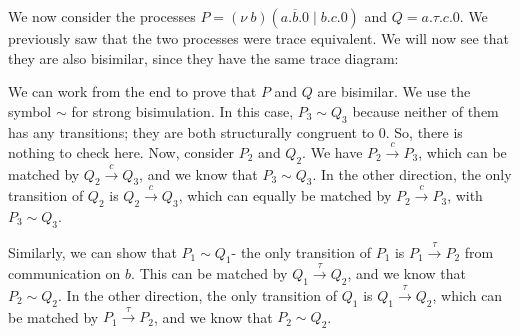 \documentclass[a4paper, openany]{memoir}
\theoremstyle{definition}
\begin{document}
    We now consider the processes $P = (\nu \ b)(a.\overline{b}.0 \mid b.c.0)$ and $Q = a.\tau.c.0$. We previously saw that the two processes were trace equivalent. We will now see that they are also bisimilar, since they have the same trace diagram:
    \begin{figure}[H]
        \centering
    \end{figure}

    We can work from the end to prove that $P$ and $Q$ are bisimilar. We use the symbol $\sim$ for strong bisimulation. In this case, $P_3 \sim Q_3$ because neither of them has any transitions; they are both structurally congruent to $0$. So, there is nothing to check here. Now, consider $P_2$ and $Q_2$. We have $P_2 \xrightarrow{c} P_3$, which can be matched by $Q_2 \xrightarrow{c} Q_3$, and we know that $P_3 \sim Q_3$. In the other direction, the only transition of $Q_2$ is $Q_2 \xrightarrow{c} Q_3$, which can equally be matched by $P_2 \xrightarrow{c} P_3$, with $P_3 \sim Q_3$.

    Similarly, we can show that $P_1 \sim Q_1$- the only transition of $P_1$ is $P_1 \xrightarrow{\tau} P_2$ from communication on $b$. This can be matched by $Q_1 \xrightarrow{\tau} Q_2$, and we know that $P_2 \sim Q_2$. In the other direction, the only transition of $Q_1$ is $Q_1 \xrightarrow{\tau} Q_2$, which can be matched by $P_1 \xrightarrow{\tau} P_2$, and we know that $P_2 \sim Q_2$. 
\end{document}
